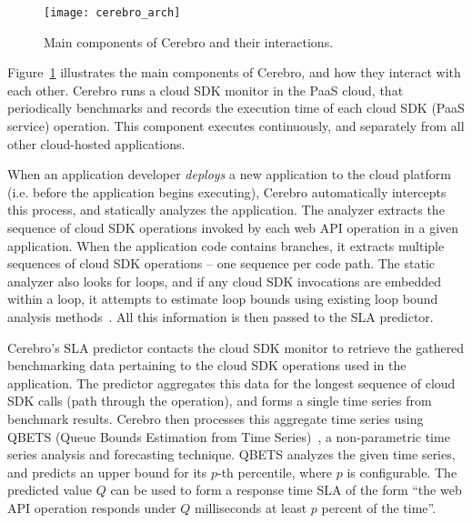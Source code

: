 \begin{figure}
\centering
\texttt{[image: cerebro\_arch]}
\caption{Main components of Cerebro and their interactions.}
\label{fig:cerebro_arch}
\vspace{-0.2in}
\end{figure}

Figure~\ref{fig:cerebro_arch} illustrates the main components of Cerebro, and how they interact with
each other. Cerebro runs a cloud SDK monitor in the PaaS cloud, that periodically benchmarks and records
the execution time of each cloud SDK (PaaS service) operation.
This component executes continuously, and separately from all other cloud-hosted applications.

When an application developer \textit{deploys} a new
application to the cloud platform (i.e. before the application begins
executing),
Cerebro automatically intercepts this process, and statically analyzes the 
application.  The analyzer extracts the sequence of cloud SDK operations invoked by each
web API operation in a given application. When the application code contains branches, it
extracts multiple sequences of cloud SDK operations -- one sequence per code path. The static
analyzer also looks for loops, and if any cloud SDK invocations are embedded within a loop, 
it attempts to estimate loop bounds using existing loop bound analysis methods~\cite{bygde2010static}.
All this information is then passed to the SLA predictor.  

Cerebro's SLA predictor contacts the cloud SDK monitor to retrieve the gathered benchmarking data
pertaining to the cloud SDK operations used in the application. The predictor aggregates
this data for the longest sequence of cloud SDK calls (path through the operation), and 
forms a single time series from benchmark results. 
Cerebro then processes this aggregate time series using QBETS (Queue
Bounds Estimation from Time Series)~\cite{Nurmi:2007:QQB:1791551.1791556}, a 
non-parametric time series analysis and forecasting technique. QBETS analyzes the given time 
series, and predicts an upper bound for its $p$-th percentile, where $p$ is configurable. The predicted
value $Q$ can be used to form a response time SLA of the form ``the web API operation responds 
under $Q$ milliseconds at least $p$ percent of the time''.

